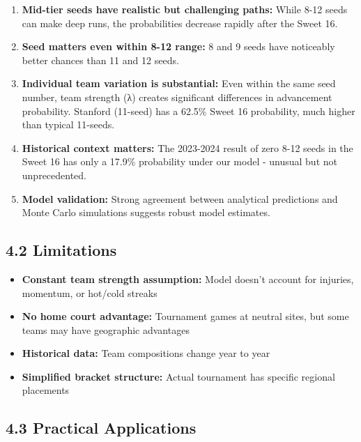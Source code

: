 \documentclass[
]{article}
\providecommand{\tightlist}{%
  \setlength{\itemsep}{0pt}\setlength{\parskip}{0pt}}
\begin{document}
\begin{enumerate}
\def\labelenumi{\arabic{enumi}.}
\item
  \textbf{Mid-tier seeds have realistic but challenging paths:} While
  8-12 seeds can make deep runs, the probabilities decrease rapidly
  after the Sweet 16.
\item
  \textbf{Seed matters even within 8-12 range:} 8 and 9 seeds have
  noticeably better chances than 11 and 12 seeds.
\item
  \textbf{Individual team variation is substantial:} Even within the
  same seed number, team strength (λ) creates significant differences in
  advancement probability. Stanford (11-seed) has a 62.5\% Sweet 16
  probability, much higher than typical 11-seeds.
\item
  \textbf{Historical context matters:} The 2023-2024 result of zero 8-12
  seeds in the Sweet 16 has only a 17.9\% probability under our model -
  unusual but not unprecedented.
\item
  \textbf{Model validation:} Strong agreement between analytical
  predictions and Monte Carlo simulations suggests robust model
  estimates.
\end{enumerate}

\subsection{4.2 Limitations}\label{limitations}

\begin{itemize}
\tightlist
\item
  \textbf{Constant team strength assumption:} Model doesn't account for
  injuries, momentum, or hot/cold streaks
\item
  \textbf{No home court advantage:} Tournament games at neutral sites,
  but some teams may have geographic advantages
\item
  \textbf{Historical data:} Team compositions change year to year
\item
  \textbf{Simplified bracket structure:} Actual tournament has specific
  regional placements
\end{itemize}

\subsection{4.3 Practical Applications}\label{practical-applications}
\end{document}
